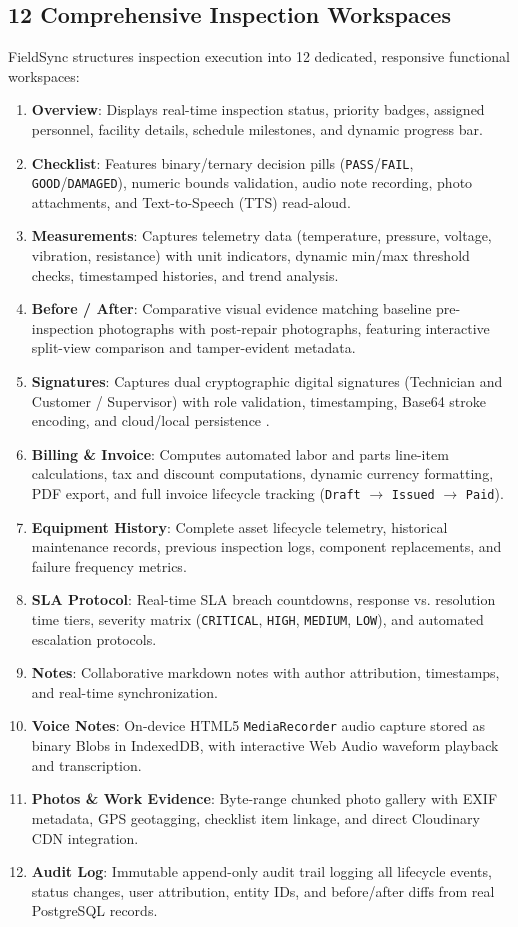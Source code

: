 \documentclass[conference]{IEEEtran}
\begin{document}
\subsection{12 Comprehensive Inspection Workspaces}
FieldSync structures inspection execution into 12 dedicated, responsive functional workspaces:
\begin{enumerate}\setlength{\itemsep}{1pt}
    \item \textbf{Overview}: Displays real-time inspection status, priority badges, assigned personnel, facility details, schedule milestones, and dynamic progress bar.
    \item \textbf{Checklist}: Features binary/ternary decision pills (\texttt{PASS}/\texttt{FAIL}, \texttt{GOOD}/\texttt{DAMAGED}), numeric bounds validation, audio note recording, photo attachments, and Text-to-Speech (TTS) read-aloud.
    \item \textbf{Measurements}: Captures telemetry data (temperature, pressure, voltage, vibration, resistance) with unit indicators, dynamic min/max threshold checks, timestamped histories, and trend analysis.
    \item \textbf{Before / After}: Comparative visual evidence matching baseline pre-inspection photographs with post-repair photographs, featuring interactive split-view comparison and tamper-evident metadata.
    \item \textbf{Signatures}: Captures dual cryptographic digital signatures (Technician and Customer / Supervisor) with role validation, timestamping, Base64 stroke encoding, and cloud/local persistence \cite{diffie1976privacy}.
    \item \textbf{Billing \& Invoice}: Computes automated labor and parts line-item calculations, tax and discount computations, dynamic currency formatting, PDF export, and full invoice lifecycle tracking (\texttt{Draft} $\rightarrow$ \texttt{Issued} $\rightarrow$ \texttt{Paid}).
    \item \textbf{Equipment History}: Complete asset lifecycle telemetry, historical maintenance records, previous inspection logs, component replacements, and failure frequency metrics.
    \item \textbf{SLA Protocol}: Real-time SLA breach countdowns, response vs. resolution time tiers, severity matrix (\texttt{CRITICAL}, \texttt{HIGH}, \texttt{MEDIUM}, \texttt{LOW}), and automated escalation protocols.
    \item \textbf{Notes}: Collaborative markdown notes with author attribution, timestamps, and real-time synchronization.
    \item \textbf{Voice Notes}: On-device HTML5 \texttt{MediaRecorder} audio capture stored as binary Blobs in IndexedDB, with interactive Web Audio waveform playback and transcription.
    \item \textbf{Photos \& Work Evidence}: Byte-range chunked photo gallery with EXIF metadata, GPS geotagging, checklist item linkage, and direct Cloudinary CDN integration.
    \item \textbf{Audit Log}: Immutable append-only audit trail logging all lifecycle events, status changes, user attribution, entity IDs, and before/after diffs from real PostgreSQL records.
\end{enumerate}
\end{document}
